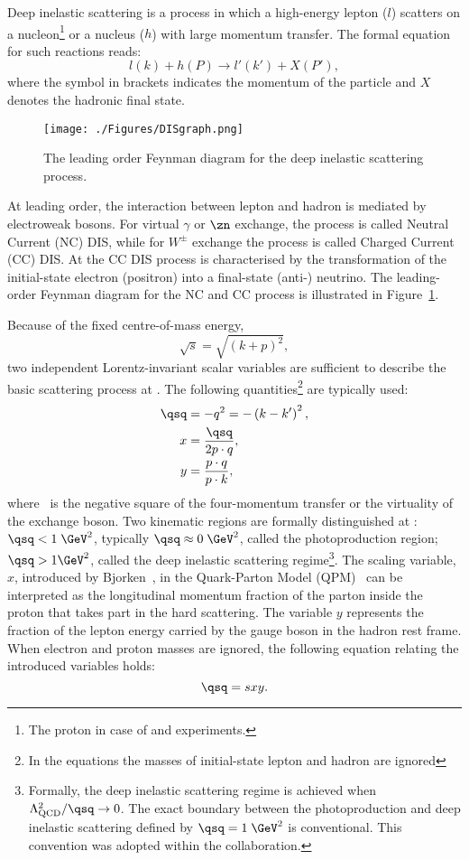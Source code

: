 Deep inelastic scattering is a process in which a high-energy lepton ($l$) scatters on a nucleon\footnote{The proton in case of \hone and \zeus experiments.} or a nucleus ($h$) with large momentum transfer. The formal equation for such reactions reads:
\[
l\left( k \right) + h\left( P \right) \rightarrow l'\left( k' \right) + X\left( P' \right),
\]
where the symbol in brackets indicates the momentum of the particle and $X$ denotes the hadronic final state.
\begin{figure}
	\centering
		\texttt{[image: ./Figures/DISgraph.png]}
	\caption{The leading order Feynman diagram for the deep inelastic scattering process.}
	\label{fig:DISgraph}
\end{figure}
At leading order, the interaction between lepton and hadron is mediated by electroweak bosons. For virtual $\gamma$ or $\zn$ exchange, the process is called Neutral Current (NC) DIS, while for $W^\pm$ exchange the process is called Charged Current (CC) DIS. At \hera the CC DIS process is characterised by the transformation of the initial-state electron (positron) into a final-state (anti-) neutrino. The leading-order Feynman diagram for the NC and CC process is illustrated in Figure~\ref{fig:DISgraph}.

Because of the fixed centre-of-mass energy, 
\begin{equation}
\sqrt{s}=\sqrt{\left(k+p\right)^2},
\end{equation} 
two independent Lorentz-invariant scalar variables are sufficient to describe the basic scattering process at \hera. The following quantities\footnote{In the equations the masses of initial-state lepton and hadron are ignored} are typically used:
\begin{align}
\qsq &= -q^2 = -\left( k - k' \right)^2,\\
     x &= \frac{\qsq}{2p\cdot q},\\
		 y &= \frac{p\cdot q}{p\cdot k},
\label{eq:vardefinit}
\end{align}
where \qsq\, is the negative square of the four-momentum transfer or the virtuality of the exchange boson. Two kinematic regions are formally distinguished at \hera: $\qsq < 1\;\GeV^2$, typically $\qsq \approx 0\;\GeV^2$, called the photoproduction region; $\qsq > 1 \GeV^2$, called the deep inelastic scattering regime\footnote{Formally, the deep inelastic scattering regime is achieved when $\Lambda_\text{QCD}^2/\qsq \rightarrow 0$. The exact boundary between the photoproduction and deep inelastic scattering defined by $\qsq = 1\;\GeV^2$ is  conventional. This convention was adopted within the \zeus collaboration.}. The scaling variable, $x$, introduced by Bjorken~\cite{Bjorken:1968dy}, in the Quark-Parton Model (QPM)~\cite{Feynman:1969ej,Feynman:1973xc} can be interpreted as the longitudinal momentum fraction of the parton inside the proton that takes part in the hard scattering. The variable $y$ represents the fraction of the lepton energy carried by the gauge boson in the hadron rest frame. When electron and proton masses are ignored, the following equation relating the introduced variables holds:
\begin{equation}
\qsq = sxy.
\label{eq:qsxy}
\end{equation}

